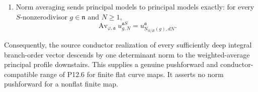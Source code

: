 \begin{theorem}
\begin{enumerate}
      \(-\infty\).  This is order preserving, preserves decreasing limits,
      and satisfies
      \[
       \rho_{\mathfrak a,*}u
          \leq\operatorname{Av}_{\varphi,\mathfrak a}u
          \leq\rho_{\mathfrak a,!}u,
       \qquad
       \operatorname{Av}_{\varphi,\mathfrak a}
          \rho_{\mathfrak a}^*=\operatorname{id}.
       \tag{\(\blacktriangleright\)}\label{eq:p126-curve-average-sandwich}
      \]
      It commutes with the change-of-normalizing-ideal transports
      \eqref{eq:p122-curve-psh-normalization-transport}, and the norm
      averages compose in towers of finite flat local maps.
\item Norm averaging sends principal models to principal models exactly:
      for every \(S\)-nonzerodivisor \(g\in\mathfrak n\) and \(N\geq1\),
      \[
       \operatorname{Av}_{\varphi,\mathfrak a}
          u^{\mathfrak aS}_{g,N}
        =u^{\mathfrak a}_{\mathrm N_{S/R}(g),dN}.
       \tag{\(\blacklozenge\)}\label{eq:p126-curve-principal-norm-descent}
      \]
\end{enumerate}
Consequently, the source conductor realization of every sufficiently deep
integral branch-order vector descends by one determinant norm to the
weighted-average principal profile downstairs.  This supplies a genuine
pushforward and conductor-compatible range of P12.6 for finite flat curve
maps.  It asserts no norm pushforward for a nonflat finite map.
\end{theorem}

